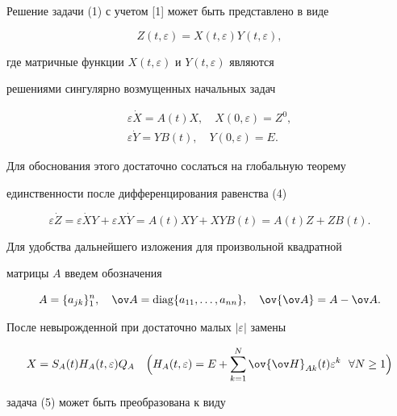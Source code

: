 \begin{pf} 


Решение задачи (1) с учетом [1] может быть представлено в виде 


\begin{equation} 


Z(t,\varepsilon)=X(t,\varepsilon)Y(t,\varepsilon), 


\end{equation} 


где матричные функции $X(t,\varepsilon)$ и $Y(t,\varepsilon)$ являются 


решениями сингулярно возмущенных начальных задач 


\begin{gather} 


\varepsilon\Dot X=A(t)X,\quad X(0,\varepsilon)=Z^0,\\ 


\varepsilon\Dot Y=YB(t),\quad Y(0,\varepsilon)=E. 


\end{gather} 


Для обоснования этого достаточно сослаться на глобальную теорему 


единственности после дифференцирования равенства (4) 


$$ 


\varepsilon\Dot Z=\varepsilon\Dot XY+\varepsilon X\Dot Y= 


A(t)XY+XYB(t)=A(t)Z+ZB(t). 


$$ 


 


Для удобства дальнейшего изложения для произвольной квадратной 


матрицы $A$ введем обозначения 


$$ 


A=\{a_{jk}\}^n_1,\quad \ov A=\diag\{a_{11},\dotsc,a_{nn}\},\quad 


\ov{\ov A}=A-\ov A. 


$$ 


После невырожденной при достаточно малых $|\varepsilon|$ замены 


$$ 


X=S_A(t)H_A(t,\varepsilon)Q_A\quad \Big(H_A(t,\varepsilon)= 


E+\sum^N_{k=1}\ov{\ov H}_{Ak}(t)\varepsilon^k\ \ \forall N\ge1\Big) 


$$ 


задача (5) может быть преобразована к виду 



\end{pf}
